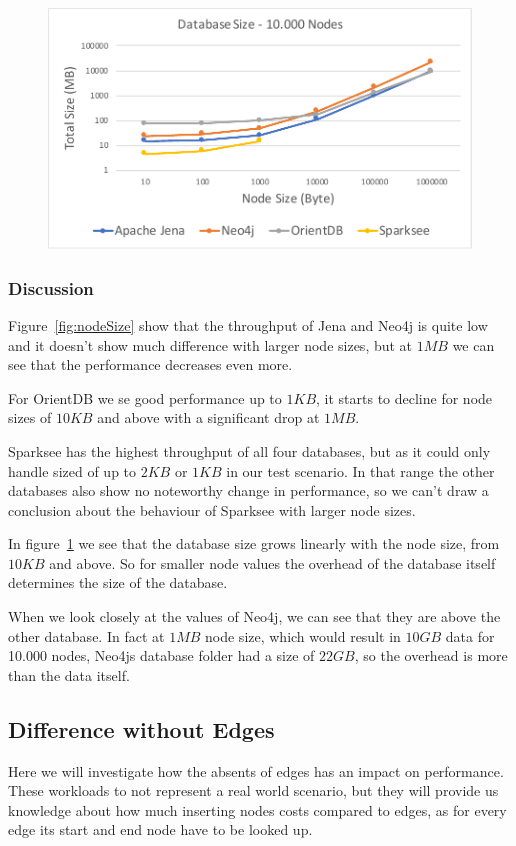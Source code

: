 \begin{figure}[h!]
  \centering
  \includegraphics[width=.75\textwidth]{images/throughput/sizeDatabaseSize}
  \label{fig:sizeDatabaseSize}
\end{figure}

\subsubsection{Discussion}
Figure~\ref{fig:nodeSize} show that the throughput of Jena and Neo4j is quite low and it doesn't show much difference with larger node sizes,
but at $ 1MB $ we can see that the performance decreases even more.

For OrientDB we se good performance up to $ 1KB $,
it starts to decline for node sizes of $ 10KB $ and above with a significant drop at $ 1MB $.

Sparksee has the highest throughput of all four databases,
but as it could only handle sized of up to $ 2KB $ or $ 1KB $ in our test scenario.
In that range the other databases also show no noteworthy change in performance,
so we can't draw a conclusion about the behaviour of Sparksee with larger node sizes.

In figure~\ref{fig:sizeDatabaseSize} we see that the database size grows linearly with the node size,
from $ 10KB $ and above.
So for smaller node values the overhead of the database itself determines the size of the database.

When we look closely at the values of Neo4j,
we can see that they are above the other database.
In fact at $ 1MB $ node size,
which would result in $ 10GB $ data for 10.000 nodes,
Neo4js database folder had a size of $ 22GB $,
so the overhead is more than the data itself.

\subsection{Difference without Edges}
\label{ch:evaluation:se:differenceEdges}
Here we will investigate how the absents of edges has an impact on performance.
These workloads to not represent a real world scenario,
but they will provide us knowledge about how much inserting nodes costs compared to edges,
as for every edge its start and end node have to be looked up.

